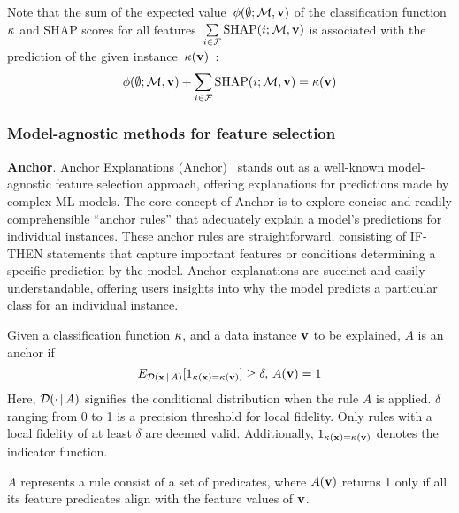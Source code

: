 Note that the sum of the expected value~$\phi(\emptyset; {\mathcal{M}}, \mathbf{v})$ of 
the classification function~$\kappa$ and SHAP scores for all
features~$\sum\limits_{i \in {\mathcal{F}}}\text{SHAP}(i;{\mathcal{M}},\mathbf{v})$ is associated with the 
prediction of the given instance~$\kappa(\mathbf{v})$~\cite{sk-jmlr10,sk-kis14,blss-jair22}:
\begin{equation}
	\phi(\emptyset; {\mathcal{M}}, \mathbf{v}) + \sum\limits_{i \in {\mathcal{F}}}\text{SHAP}(i;{\mathcal{M}},\mathbf{v})  = \kappa(\mathbf{v})
\end{equation}

\subsubsection{Model-agnostic methods for feature selection}

\textbf{Anchor}.
Anchor Explanations (Anchor)~\cite{guestrin-aaai18} stands out as a well-known model-agnostic
feature selection approach, offering explanations for predictions made by complex ML models.
%
The core concept of Anchor is to explore concise and readily comprehensible ``anchor rules'' 
that adequately explain a model's predictions for individual instances.
%
These anchor rules are straightforward, consisting of IF-THEN statements that
capture important features or conditions determining a specific prediction by the model.
%
Anchor explanations are succinct and easily understandable, offering users insights into 
why the model predicts a particular class for an individual instance.

\begin{definition} \label{def:anchor}
	Given a classification function $\kappa$, and a data instance $\mathbf{v}$
	to be explained, $A$ is an anchor if
	\begin{equation}
		E_{{\mathcal{D}}(\mathbf{x}\,|\,A)}[1_{\kappa(\mathbf{x})=\kappa(\mathbf{v})}] \geq \delta,\,
		A(\mathbf{v}) = 1
	\end{equation}
	Here, ${\mathcal{D}} (\cdot\,|\,A)$ signifies the conditional distribution when the rule $A$ is
	applied.
	$\delta$ ranging from 0 to 1 is a precision threshold for local fidelity.
	Only rules with a local fidelity of at least $\delta$ are deemed valid.
	Additionally, $1_{\kappa(\mathbf{x}) = \kappa(\mathbf{v})}$ denotes the indicator function.
\end{definition}

$A$ represents a rule consist of a set of predicates, where
$A(\mathbf{v})$ returns 1 only if all its feature predicates align with the feature values of
$\mathbf{v}$.

